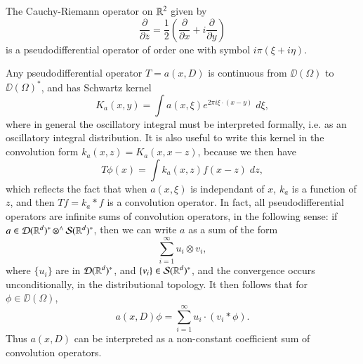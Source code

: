\begin{example}
    The Cauchy-Riemann operator on $\operatorname{\mathbb{R}}^2$ given by
    \[ \frac{\partial}{\partial \overline{z}} = \frac{1}{2} \left( \frac{\partial}{\partial x} + i \frac{\partial}{\partial y} \right) \]
    is a pseudodifferential operator of order one with symbol $i \pi(\xi + i \eta)$.
\end{example}

Any pseudodifferential operator $T = a(x,D)$ is continuous from $\DD(\Omega)$ to $\DD(\Omega)^*$, and has Schwartz kernel
%
\[ K_a(x,y) = \int a(x,\xi) e^{2 \pi i \xi \cdot (x - y)}\; d\xi, \]
%
where in general the oscillatory integral must be interpreted formally, i.e. as an oscillatory integral distribution. It is also useful to write this kernel in the convolution form $k_a(x,z) = K_a(x,x-z)$, because we then have
%
\[ T\phi(x) = \int k_a(x,z) f(x-z)\; dz, \]
%
which reflects the fact that when $a(x,\xi)$ is independant of $x$, $k_a$ is a function of $z$, and then $Tf = k_a * f$ is a convolution operator. In fact, all pseudodifferential operators are infinite sums of convolution operators, in the following sense: if $a \in \operatorname{\mathcal{D}}(\operatorname{\mathbb{R}}^d)^* \operatorname{{{\otimes}^\wedge}} \operatorname{\mathcal{S}}(\operatorname{\mathbb{R}}^d)^*$, then we can write $a$ as a sum of the form
%
\[ \sum_{i = 1}^\infty u_i \otimes v_i, \]
%
where $\{ u_i \}$ are in $\operatorname{\mathcal{D}}(\operatorname{\mathbb{R}}^d)^*$, and $\{ v_i \} \in \operatorname{\mathcal{S}}(\operatorname{\mathbb{R}}^d)^*$, and the convergence occurs unconditionally, in the distributional topology. It then follows that for $\phi \in \DD(\Omega)$,
%
\[ a(x,D) \phi = \sum_{i = 1}^\infty u_i \cdot (v_i * \phi). \]
%
Thus $a(x,D)$ can be interpreted as a non-constant coefficient sum of convolution operators.

